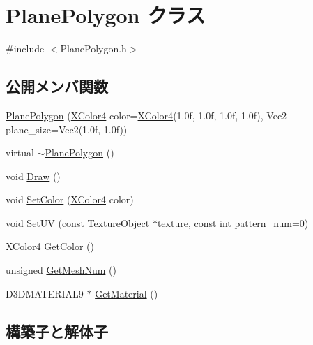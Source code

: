 \hypertarget{class_plane_polygon}{}\section{Plane\+Polygon クラス}
\label{class_plane_polygon}


{\ttfamily \#include $<$Plane\+Polygon.\+h$>$}

\subsection*{公開メンバ関数}
\begin{DoxyCompactItemize}
\item 
\mbox{\hyperlink{class_plane_polygon_a27987c23a242840b142e0fa11650daf6}{Plane\+Polygon}} (\mbox{\hyperlink{_vector3_d_8h_a680c30c4a07d86fe763c7e01169cd6cc}{X\+Color4}} color=\mbox{\hyperlink{_vector3_d_8h_a680c30c4a07d86fe763c7e01169cd6cc}{X\+Color4}}(1.\+0f, 1.\+0f, 1.\+0f, 1.\+0f), Vec2 plane\+\_\+size=\+Vec2(1.\+0f, 1.\+0f))
\item 
virtual \mbox{\hyperlink{class_plane_polygon_ac91d7ac1ceb00239f54b543690a78dab}{$\sim$\+Plane\+Polygon}} ()
\item 
void \mbox{\hyperlink{class_plane_polygon_a2f20691ee0feee4fa428f5d017d7062a}{Draw}} ()
\item 
void \mbox{\hyperlink{class_plane_polygon_a55307fc341641d7fd42fe2269acbd113}{Set\+Color}} (\mbox{\hyperlink{_vector3_d_8h_a680c30c4a07d86fe763c7e01169cd6cc}{X\+Color4}} color)
\item 
void \mbox{\hyperlink{class_plane_polygon_a081458fcb9e758dd8be5b027c66a92ad}{Set\+UV}} (const \mbox{\hyperlink{class_texture_object}{Texture\+Object}} $\ast$texture, const int pattern\+\_\+num=0)
\item 
\mbox{\hyperlink{_vector3_d_8h_a680c30c4a07d86fe763c7e01169cd6cc}{X\+Color4}} \mbox{\hyperlink{class_plane_polygon_ac4f8f7b51acdb744231efd342d3b2734}{Get\+Color}} ()
\item 
unsigned \mbox{\hyperlink{class_plane_polygon_a05f4f63c2d04d30f7b9808c009101403}{Get\+Mesh\+Num}} ()
\item 
D3\+D\+M\+A\+T\+E\+R\+I\+A\+L9 $\ast$ \mbox{\hyperlink{class_plane_polygon_a808087c9d82c0eb7cfb0709c9906e833}{Get\+Material}} ()
\end{DoxyCompactItemize}


\subsection{構築子と解体子}
\mbox{\label{class_plane_polygon_a27987c23a242840b142e0fa11650daf6}} 
